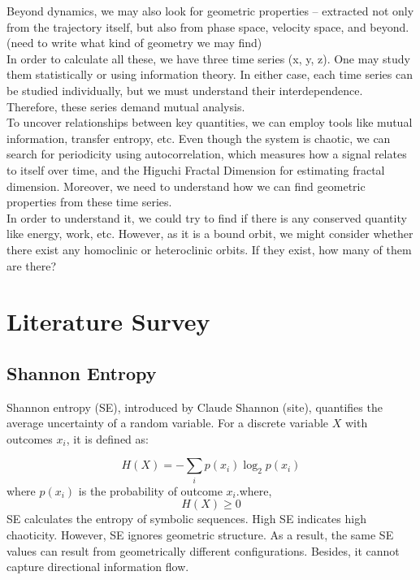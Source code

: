 \documentclass[%
reprint,
amsmath,amssymb,
aps,
floatfix,
]{revtex4-2}
\begin{document}
	Beyond dynamics, we may also look for geometric properties – extracted not only from the trajectory itself, but also from phase space, velocity space, and beyond. (need to write what kind of geometry we may find)\\
	In order to calculate all these, we have three time series (x, y, z). One may study them statistically or using information theory. In either case, each time series can be studied individually, but we must understand their interdependence. Therefore, these series demand mutual analysis.\\
	To uncover relationships between key quantities, we can employ tools like mutual information\cite{kraskov2004estimating}, transfer entropy\cite{PhysRevLett.85.461}, etc. Even though the system is chaotic, we can search for periodicity using autocorrelation\cite{yule1926nonsense}, which measures how a signal relates to itself over time, and the Higuchi Fractal Dimension\cite{HIGUCHI1988277} for estimating fractal dimension. Moreover, we need to understand how we can find geometric properties from these time series.\\
	In order to understand it, we could try to find if there is any conserved quantity like energy, work, etc. However, as it is a bound orbit, we might consider whether there exist any homoclinic or heteroclinic orbits. If they exist, how many of them are there?

	\section{Literature Survey}
	\subsection{Shannon Entropy}
	Shannon entropy (SE), introduced by Claude Shannon (site), quantifies the average uncertainty of a random variable. For a discrete variable $X$ with outcomes ${x_i}$, it is defined as:
	
	\begin{equation}
		H(X) = -\sum_{i} p(x_i) \log_2 p(x_i)
		\label{eq:shannon}
	\end{equation}
	where $p(x_i)$ is the probability of outcome $x_i$.where,
	\[
	H(X) \geq 0
	\]
	SE calculates the entropy of symbolic sequences. High SE indicates high chaoticity. However, SE ignores geometric structure. As a result, the same SE values can result from geometrically different configurations. Besides, it cannot capture directional information flow.\\
\end{document}
